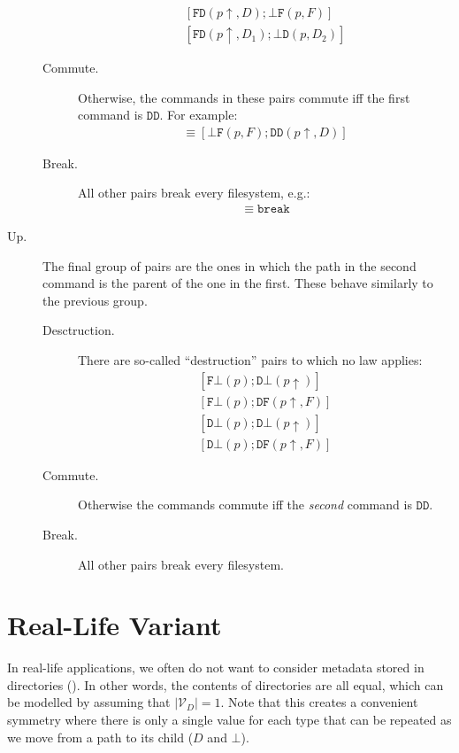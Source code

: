 \documentclass[12pt]{article}
\newcommand{\setvx}[1]{\mathcal{V}_{#1}}
\newcommand{\setd}{\setvx{D}}
\newcommand{\empt}{\bot}
\newcommand{\pp}{p\!\!\uparrow} %
\newcommand{\cbrk}{\mathtt{break}}
\newcommand{\fscommand}[2]{{#1#2}}
\newcommand{\fsregcommandchar}[1]{\mathtt{#1}}
\newcommand{\fsregcommand}[2]{\fscommand{\fsregcommandchar{#1}}{\fsregcommandchar{#2}}}
\newcommand{\cbf}{\fsregcommand{\empt}{F}}
\newcommand{\cbd}{\fsregcommand{\empt}{D}}
\newcommand{\cfb}{\fsregcommand{F}{\empt}}
\newcommand{\cfd}{\fsregcommand{F}{D}}
\newcommand{\cdb}{\fsregcommand{D}{\empt}}
\newcommand{\cdf}{\fsregcommand{D}{F}}
\newcommand{\cdd}{\fsregcommand{D}{D}}
\theoremstyle{definition}
\begin{document}
\begin{description}
\begin{description}
\begin{gather*}
            [\cfd(\pp, D); \cbf(p, F)] \\
            [\cfd(\pp, D_1); \cbd(p, D_2)]
   \end{gather*}
   \item[Commute.] Otherwise, the commands in these pairs commute iff the first command is $\cdd$. For example:
   \begin{gather*}
   [\cdd(\pp, D); \cbf(p, F)] \equiv [\cbf(p, F); \cdd(\pp, D)]
   \end{gather*}
   \item[Break.] All other pairs break every filesystem, e.g.:
   \begin{gather*}
   [\cdf(\pp, F); \cbd(p, D)] \equiv \cbrk
   \end{gather*}
   \end{description}
%
\item[Up.]
The final group of pairs are the ones in which the path in the second
command is the parent of the one in the first.
These behave similarly to the previous group. 
   \begin{description}
   \item[Desctruction.] There are
   so-called ``destruction'' pairs to which no law applies:
   \begin{gather*}
            [\cfb(p); \cdb(\pp)] \\
            [\cfb(p); \cdf(\pp, F)] \\
            [\cdb(p); \cdb(\pp)] \\
            [\cdb(p); \cdf(\pp, F)]
   \end{gather*}
   \item[Commute.] Otherwise the commands commute iff the \emph{second} command is $\cdd$.
   \item[Break.] All other pairs break every filesystem.
   \end{description}
\end{description}

\section{Real-Life Variant}

In real-life applications, we often do not want to consider metadata stored in
directories (\cite{BZ}). In other words, the contents of directories are all equal,
which can be modelled by assuming that $|\setd|=1$.
Note that this creates a convenient symmetry where there is only a single value
for each type that can be repeated as we move from a path to its child ($D$ and $\empt$).
\end{document}
